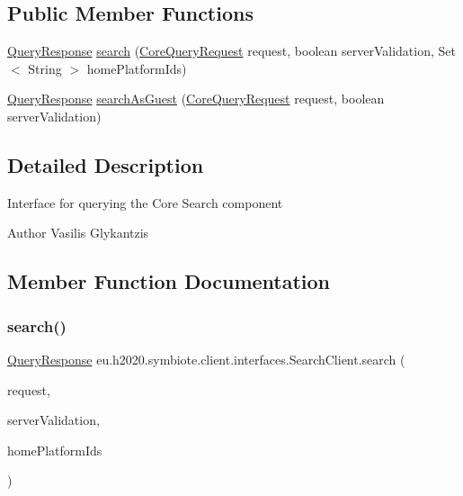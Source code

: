 \subsection*{Public Member Functions}
\begin{DoxyCompactItemize}
\item 
\hyperlink{classeu_1_1h2020_1_1symbiote_1_1core_1_1ci_1_1QueryResponse}{Query\+Response} \hyperlink{interfaceeu_1_1h2020_1_1symbiote_1_1client_1_1interfaces_1_1SearchClient_a67747d2a47bb3d8d5def6e605bdceb4d}{search} (\hyperlink{classeu_1_1h2020_1_1symbiote_1_1core_1_1internal_1_1CoreQueryRequest}{Core\+Query\+Request} request, boolean server\+Validation, Set$<$ String $>$ home\+Platform\+Ids)
\item 
\hyperlink{classeu_1_1h2020_1_1symbiote_1_1core_1_1ci_1_1QueryResponse}{Query\+Response} \hyperlink{interfaceeu_1_1h2020_1_1symbiote_1_1client_1_1interfaces_1_1SearchClient_aba8a879a8b835f3db8e5e1ea674ffd25}{search\+As\+Guest} (\hyperlink{classeu_1_1h2020_1_1symbiote_1_1core_1_1internal_1_1CoreQueryRequest}{Core\+Query\+Request} request, boolean server\+Validation)
\end{DoxyCompactItemize}


\subsection{Detailed Description}
Interface for querying the Core Search component

\begin{DoxyAuthor}{Author}
Vasilis Glykantzis 
\end{DoxyAuthor}


\subsection{Member Function Documentation}
\mbox{\label{interfaceeu_1_1h2020_1_1symbiote_1_1client_1_1interfaces_1_1SearchClient_a67747d2a47bb3d8d5def6e605bdceb4d}} 
\subsubsection{\texorpdfstring{search()}{search()}}
{\footnotesize\ttfamily \hyperlink{classeu_1_1h2020_1_1symbiote_1_1core_1_1ci_1_1QueryResponse}{Query\+Response} eu.\+h2020.\+symbiote.\+client.\+interfaces.\+Search\+Client.\+search (\begin{DoxyParamCaption}\item[{\hyperlink{classeu_1_1h2020_1_1symbiote_1_1core_1_1internal_1_1CoreQueryRequest}{Core\+Query\+Request}}]{request,  }\item[{boolean}]{server\+Validation,  }\item[{Set$<$ String $>$}]{home\+Platform\+Ids }\end{DoxyParamCaption})}

